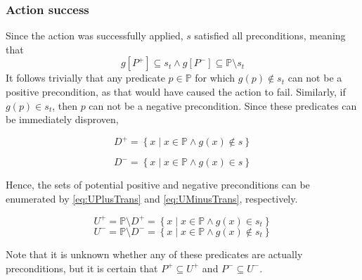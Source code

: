\documentclass[../Master.tex]{subfiles}
\begin{document}
\subsubsection*{Action success}
Since the action was successfully applied, $s$ satisfied all preconditions, meaning that
        \[ g\left[P^+\right] \subseteq s_t \land
            g\left[P^-\right] \subseteq \mathbb{P} \setminus s_t
        \]
It follows trivially that any predicate $p \in \mathbb{P}$ for which $g(p) \notin s_t$ can not be a positive precondition, as that would have caused the action to fail. Similarly, if $g(p) \in s_t$, then $p$ can not be a negative precondition. Since these predicates can be immediately disproven,

\begin{equation} \label{eq:DPlusTrans}
    D^+ = \left\{ x \; | \; x \in \mathbb{P} \land g(x) \notin s \right\}
\end{equation}

\begin{equation} \label{eq:DMinusTrans}
    D^- = \left\{ x \; | \; x \in \mathbb{P} \land g(x) \in s \right\}
\end{equation}

Hence, the sets of potential positive and negative preconditions can be enumerated by \eqref{eq:UPlusTrans} and \eqref{eq:UMinusTrans}, respectively.

\begin{equation} \label{eq:UPlusTrans}
    U^+ = \mathbb{P} \setminus D^+ =
        \left\{ x \; | \; x \in \mathbb{P} \land g(x) \in s_t \right\}
\end{equation}
\begin{equation} \label{eq:UMinusTrans}
    U^- = \mathbb{P} \setminus D^- =
        \left\{ x \; | \; x \in \mathbb{P} \land g(x) \notin s_t \right\}
\end{equation}

Note that it is unknown whether any of these predicates are actually preconditions, but it is certain that $P^+ \subseteq U^+$ and $P^- \subseteq U^-$.
\end{document}
